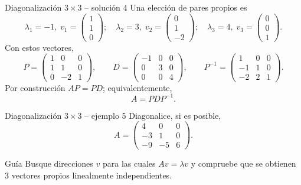 \documentclass[aspectratio=169,10pt]{beamer}
\begin{document}
\begin{frame}{Diagonalización $3\times 3$ -- solución 4}
\scriptsize
Una elección de pares propios es
\[
\lambda_1=-1,\;v_1=\begin{pmatrix}1\\1\\0\end{pmatrix};\quad \lambda_2=3,\;v_2=\begin{pmatrix}0\\1\\-2\end{pmatrix};\quad \lambda_3=4,\;v_3=\begin{pmatrix}0\\0\\1\end{pmatrix}.
\]
Con estos vectores,
\[
P=\begin{pmatrix}1 & 0 & 0\\1 & 1 & 0\\0 & -2 & 1\end{pmatrix},\qquad D=\begin{pmatrix}-1 & 0 & 0\\0 & 3 & 0\\0 & 0 & 4\end{pmatrix},\qquad P^{-1}=\begin{pmatrix}1 & 0 & 0\\-1 & 1 & 0\\-2 & 2 & 1\end{pmatrix}.
\]
Por construcción $AP=PD$; equivalentemente,
\[
\boxed{A=PDP^{-1}}.
\]
\end{frame}
\begin{frame}{Diagonalización $3\times 3$ -- ejemplo 5}
\small
Diagonalice, si es posible,
\[
A=\begin{pmatrix}4 & 0 & 0\\-3 & 1 & 0\\-9 & -5 & 6\end{pmatrix}.
\]
\begin{block}{Guía}
Busque direcciones $v$ para las cuales $Av=\lambda v$ y compruebe que se obtienen $3$ vectores propios linealmente independientes.
\end{block}
\end{frame}
\end{document}
